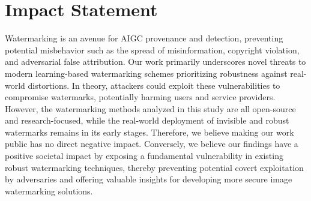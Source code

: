 \section*{Impact Statement}

Watermarking is an avenue for AIGC provenance and detection, preventing potential misbehavior such as the spread of misinformation, copyright violation, and adversarial false attribution. Our work primarily underscores novel threats to modern learning-based watermarking schemes prioritizing robustness against real-world distortions. In theory, attackers could exploit these vulnerabilities to compromise watermarks, potentially harming users and service providers. However, the watermarking methods analyzed in this study are all open-source and research-focused, while the real-world deployment of invisible and robust watermarks remains in its early stages. Therefore, we believe making our work public has no direct negative impact. Conversely, we believe our findings have a positive societal impact by exposing a fundamental vulnerability in existing robust watermarking techniques, thereby preventing potential covert exploitation by adversaries and offering valuable insights for developing more secure image watermarking solutions.



